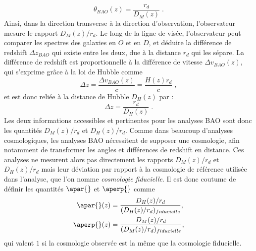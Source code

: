 \begin{equation}
  \label{eq:theta_bao}
  \theta_{BAO}(z) = \frac{r_d}{D_M(z)} \; .
\end{equation}
Ainsi, dans la direction transverse à la direction d'observation, l'observateur mesure le rapport $D_M(z) / r_d$. Le long de la ligne de visée, l'observateur peut comparer les spectres des galaxies en $O$ et en $D$, et déduire la différence de redshift $\Delta z_{BAO}$ qui existe entre les deux, due à la distance $r_d$ qui les sépare. La différence de redshift est proportionnelle à la différence de vitesse $\Delta v_{BAO}(z)$, qui s'exprime grâce à la loi de Hubble comme
\begin{equation}
  \label{eq:v_bao}
\Delta z =  \frac{\Delta v_{BAO}(z)}{c} = \frac{H(z) r_d}{c}  \; ,
\end{equation}
et est donc reliée à la distance de Hubble $D_H(z)$ par :
\begin{equation}
  \label{eq:v_bao2}
  \Delta z = \frac{r_d }{D_H(z)} \; .
\end{equation}
Les deux informations accessibles et pertinentes pour les analyses BAO sont donc les quantités $D_M(z) / r_d$ et $D_H(z) / r_d$. Comme dans beaucoup d'analyses cosmologiques, les analyses BAO nécessitent de supposer une cosmologie, afin notamment de transformer les angles et différences de redshift en distance. Ces analyses ne mesurent alors pas directement les rapports  $D_M(z) / r_d$ et $D_H(z) / r_d$ mais leur déviation par rapport à la cosmologie de référence utilisée dans l'analyse, que l'on nomme \emph{cosmologie fiducielle}. Il est donc coutume de définir les quantités $\apar{}$ et $\aperp{}$ comme
\begin{align}
  \label{eq:apar}
  \apar{}(z) &= \frac{D_H(z) / r_d}{(D_H(z) / r_d)_{fiducielle}} , \\
  \label{eq:aperp}
  \aperp{}(z) &= \frac{D_M(z) / r_d}{(D_M(z) / r_d)_{fiducielle}} ,
\end{align}
qui valent $1$ si la cosmologie observée est la même que la cosmologie fiducielle.


